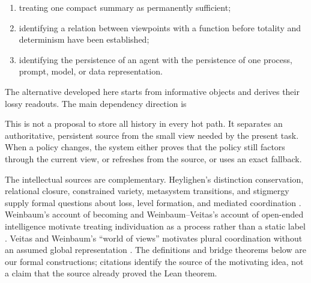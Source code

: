 \documentclass[11pt]{article}
\begin{document}
\begin{enumerate}[label=(\arabic*)]
\item treating one compact summary as permanently sufficient;
\item identifying a relation between viewpoints with a function before totality and
      determinism have been established;
\item identifying the persistence of an agent with the persistence of one process,
      prompt, model, or data representation.
\end{enumerate}

The alternative developed here starts from informative objects and derives their
lossy readouts.  The main dependency direction is

\begin{center}
\end{center}

This is not a proposal to store all history in every hot path.  It separates an
authoritative, persistent source from the small view needed by the present task.
When a policy changes, the system either proves that the policy still factors through
the current view, or refreshes from the source, or uses an exact fallback.

The intellectual sources are complementary.  Heylighen's distinction conservation,
relational closure, constrained variety, metasystem transitions, and stigmergy supply
formal questions about loss, level formation, and mediated coordination
\cite{heylighen1989,heylighen1990,heylighen1995,heylighen2015}.  Weinbaum's account of
becoming and Weinbaum--Veitas's account of open-ended intelligence motivate treating
individuation as a process rather than a static label
\cite{weinbaum2015,weinbaum2018,weinbaumveitas2015}.  Veitas and Weinbaum's ``world of
views'' motivates plural coordination without an assumed global representation
\cite{veitasweinbaum2014,veitasweinbaum2015}.  The definitions and bridge theorems
below are our formal constructions; citations identify the source of the motivating
idea, not a claim that the source already proved the Lean theorem.
\end{document}
